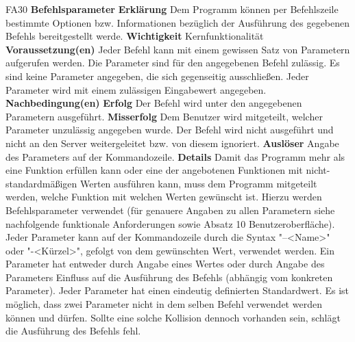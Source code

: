 \documentclass[a4paper,12pt]{article}
\begin{document}
\begin{itemize}[nosep]
\begin{minipage}[t]{\linewidth}
\item[FA30] \textbf{Befehlsparameter}
\subitem \textbf{Erklärung} Dem Programm können per Befehlszeile bestimmte Optionen bzw. Informationen bezüglich der Ausführung des gegebenen Befehls bereitgestellt werde.
\subitem \textbf{Wichtigkeit} Kernfunktionalität
\subitem \textbf{Voraussetzung(en)} Jeder Befehl kann mit einem gewissen Satz von Parametern aufgerufen werden.\newline
Die Parameter sind für den angegebenen Befehl zulässig.\newline
Es sind keine Parameter angegeben, die sich gegenseitig ausschließen.\newline
Jeder Parameter wird mit einem zulässigen Eingabewert angegeben.
\subitem \textbf{Nachbedingung(en)}
\subsubitem \textbf{Erfolg} Der Befehl wird unter den angegebenen Parametern ausgeführt.
\subsubitem \textbf{Misserfolg} Dem Benutzer wird mitgeteilt, welcher Parameter unzulässig angegeben wurde.\newline
Der Befehl wird nicht ausgeführt und nicht an den \gls{Server} weitergeleitet bzw. von diesem ignoriert.
\subitem \textbf{Auslöser} Angabe des Parameters auf der Kommandozeile.
\subitem \textbf{Details} Damit das Programm mehr als eine Funktion erfüllen kann oder eine der angebotenen Funktionen mit nicht-standardmäßigen Werten ausführen kann, muss dem Programm mitgeteilt werden, welche Funktion mit welchen Werten gewünscht ist. Hierzu werden Befehlsparameter verwendet (für genauere Angaben zu allen Parametern siehe nachfolgende funktionale Anforderungen sowie Absatz 10 Benutzeroberfläche).\newline
Jeder Parameter kann auf der Kommandozeile durch die Syntax "--<Name>" oder "-<Kürzel>", gefolgt von dem gewünschten Wert, verwendet werden.\newline
Ein Parameter hat entweder durch Angabe eines Wertes oder durch Angabe des Parameters Einfluss auf die Ausführung des Befehls (abhängig vom konkreten Parameter).\newline
Jeder Parameter hat einen eindeutig definierten Standardwert.\newline
Es ist möglich, dass zwei Parameter nicht in dem selben Befehl verwendet werden können und dürfen. Sollte eine solche Kollision dennoch vorhanden sein, schlägt die Ausführung des Befehls fehl.
\end{minipage}
\pagebreak


\end{itemize}
\end{document}
